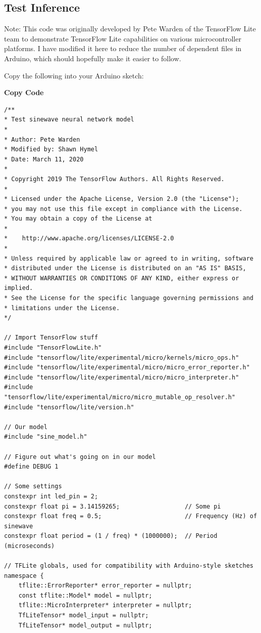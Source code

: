 \subsection{Test Inference}

Note: This code was originally developed by Pete Warden of the TensorFlow Lite team to demonstrate TensorFlow Lite capabilities on various microcontroller platforms. I have modified it here to reduce the number of dependent files in Arduino, which should hopefully make it easier to follow.

Copy the following into your Arduino sketch:



\medskip

 \textbf{Copy Code}
 
\begin{lstlisting} 
/**
* Test sinewave neural network model
* 
* Author: Pete Warden
* Modified by: Shawn Hymel
* Date: March 11, 2020
* 
* Copyright 2019 The TensorFlow Authors. All Rights Reserved.
*
* Licensed under the Apache License, Version 2.0 (the "License");
* you may not use this file except in compliance with the License.
* You may obtain a copy of the License at
*
*    http://www.apache.org/licenses/LICENSE-2.0
* 
* Unless required by applicable law or agreed to in writing, software
* distributed under the License is distributed on an "AS IS" BASIS,
* WITHOUT WARRANTIES OR CONDITIONS OF ANY KIND, either express or implied.
* See the License for the specific language governing permissions and
* limitations under the License.
*/

// Import TensorFlow stuff
#include "TensorFlowLite.h"
#include "tensorflow/lite/experimental/micro/kernels/micro_ops.h"
#include "tensorflow/lite/experimental/micro/micro_error_reporter.h"
#include "tensorflow/lite/experimental/micro/micro_interpreter.h"
#include "tensorflow/lite/experimental/micro/micro_mutable_op_resolver.h"
#include "tensorflow/lite/version.h"

// Our model
#include "sine_model.h"

// Figure out what's going on in our model
#define DEBUG 1

// Some settings
constexpr int led_pin = 2;
constexpr float pi = 3.14159265;                  // Some pi
constexpr float freq = 0.5;                       // Frequency (Hz) of sinewave
constexpr float period = (1 / freq) * (1000000);  // Period (microseconds)

// TFLite globals, used for compatibility with Arduino-style sketches
namespace {
    tflite::ErrorReporter* error_reporter = nullptr;
    const tflite::Model* model = nullptr;
    tflite::MicroInterpreter* interpreter = nullptr;
    TfLiteTensor* model_input = nullptr;
    TfLiteTensor* model_output = nullptr;
    

\end{lstlisting}
